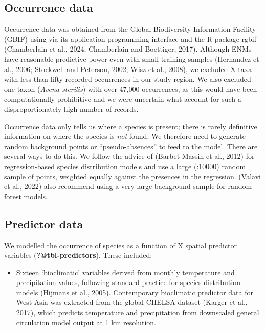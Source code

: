 \documentclass[
  number,
  review]{elsarticle}
\providecommand{\tightlist}{%
  \setlength{\itemsep}{0pt}\setlength{\parskip}{0pt}}\usepackage{longtable,booktabs,array}
\begin{document}
\subsection{Occurrence data}\label{occurrence-data-1}

Occurrence data was obtained from the Global Biodiversity Information
Facility (GBIF) using via its application programming interface and the
R package rgbif (Chamberlain et al., 2024; Chamberlain and Boettiger,
2017). Although ENMs have reasonable predictive power even with small
training samples (Hernandez et al., 2006; Stockwell and Peterson, 2002;
Wisz et al., 2008), we excluded X taxa with less than fifty recorded
occurrences in our study region. We also excluded one taxon (\emph{Avena
sterilis}) with over 47,000 occurrences, as this would have been
computationally prohibitive and we were uncertain what account for such
a disproportionately high number of records.

Occurrence data only tells us where a species is present; there is
rarely definitive information on where the species is \emph{not} found.
We therefore need to generate random background points or
``pseudo-absences'' to feed to the model. There are several ways to do
this. We follow the advice of (Barbet-Massin et al., 2012) for
regression-based species distribution models and use a large (:10000)
random sample of points, weighted equally against the presences in the
regression. (Valavi et al., 2022) also recommend using a very large
background sample for random forest models.

\subsection{Predictor data}\label{predictor-data}

We modelled the occurrence of species as a function of X spatial
predictor variables (\textbf{?@tbl-predictors}). These included:

\begin{itemize}
\tightlist
\item
  Sixteen `bioclimatic' variables derived from monthly temperature and
  precipitation values, following standard practice for species
  distribution models (Hijmans et al., 2005). Contemporary bioclimatic
  predictor data for West Asia was extracted from the global CHELSA
  dataset (Karger et al., 2017), which predicts temperature and
  precipitation from downscaled general circulation model output at 1 km
  resolution.
\end{itemize}
\end{document}
